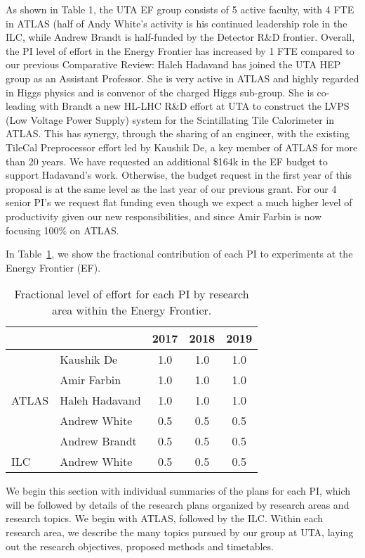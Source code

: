 
As shown in Table 1, the UTA EF group consists of 5 active faculty, with 4 FTE in ATLAS (half of Andy White's activity is his continued leadership role in the ILC, while Andrew Brandt is half-funded by the Detector R\&D frontier. Overall, the PI level of effort in the Energy Frontier has increased by 1 FTE compared to our previous Comparative Review: Haleh Hadavand has joined the UTA HEP group as an Assistant Professor. She is very active in ATLAS and highly regarded in Higgs physics and is convenor of the charged Higgs sub-group. She is co-leading with  Brandt a new HL-LHC R\&D effort at UTA to construct the LVPS (Low Voltage Power Supply) system for the Scintillating Tile Calorimeter in ATLAS. This has synergy, through the sharing of an engineer, with the existing TileCal Preprocessor effort led by Kaushik De, a key member of ATLAS for more than 20 years. We have requested an additional \$164k in the EF budget to support Hadavand's  work. Otherwise, the budget request in the first year of this proposal is at the  same level as the last year of our previous grant. For our 4 senior PI's we request flat funding even though we expect a much higher level of productivity given our new responsibilities, and since Amir Farbin is now focusing 100\% on ATLAS.   

In Table~\ref{table:ef-fractions}, we show the fractional contribution of each PI to experiments at the Energy Frontier (EF).

\begin{table}[htb]
\centering
\begin{tabular}{ l | l | c | c | c }
\hline \hline
\multicolumn{2}{c|}{} & 2017 & 2018 & 2019 \\ \hline
\multirow{5}{*}{ATLAS} & Kaushik De & 1.0 & 1.0 & 1.0 \\ \cline{2-5}
 & Amir Farbin & 1.0 & 1.0 &1.0 \\ \cline{2-5}
 & Haleh Hadavand & 1.0 & 1.0 & 1.0 \\ \cline{2-5}
 & Andrew White & 0.5 & 0.5 & 0.5 \\ \cline{2-5}
 & Andrew Brandt & 0.5 & 0.5 & 0.5 \\ \hline
ILC & Andrew White & 0.5 & 0.5 & 0.5 \\ \hline  \hline
\end{tabular}
\caption{Fractional level of effort for each PI by research area within the Energy Frontier.}
\label{table:ef-fractions}
\end{table}

We begin this section with individual summaries of the plans for each PI, which will be followed by details of the research plans organized by research areas and research topics. We begin with ATLAS, followed by the ILC. Within each research area, we describe the many topics pursued by our group at UTA, laying out the research objectives, proposed methods and timetables.

